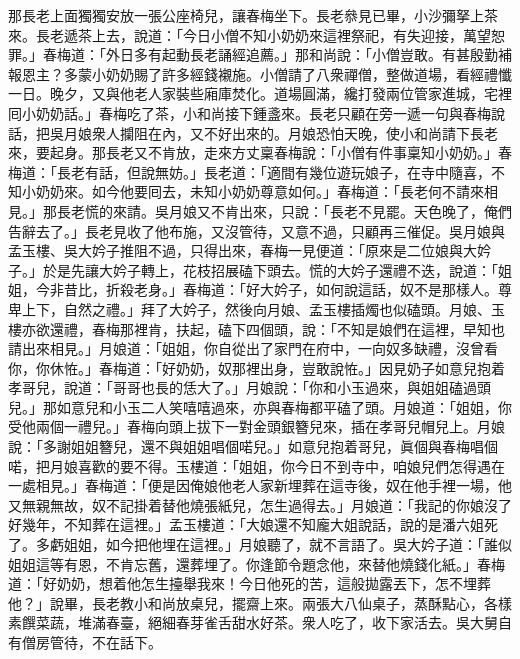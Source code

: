 那長老上面獨獨安放一張公座椅兒，讓春梅坐下。長老叅見已畢，小沙彌拏上茶來。長老遞茶上去，說道：「今日小僧不知小奶奶來這裡祭祀，有失迎接，萬望恕罪。」春梅道：「外日多有起動長老誦經追薦。」那和尚說：「小僧豈敢。有甚殷勤補報恩主？多蒙小奶奶賜了許多經錢襯施。小僧請了八衆禪僧，整做道場，看經禮懺一日。晚夕，又與他老人家裝些廂庫焚化。道場圓滿，纔打發兩位管家進城，宅裡囘小奶奶話。」春梅吃了茶，小和尚接下鍾盞來。長老只顧在旁一遞一句與春梅說話，把吳月娘衆人攔阻在內，又不好出來的。月娘恐怕天晚，使小和尚請下長老來，要起身。那長老又不肯放，走來方丈稟春梅說：「小僧有件事稟知小奶奶。」春梅道：「長老有話，但說無妨。」長老道：「適間有幾位遊玩娘子，在寺中隨喜，不知小奶奶來。如今他要囘去，未知小奶奶尊意如何。」春梅道：「長老何不請來相見。」那長老慌的來請。吳月娘又不肯出來，只說：「長老不見罷。天色晚了，俺們告辭去了。」{}長老見收了他布施，又沒管待，又意不過，只顧再三催促。吳月娘與孟玉樓、吳大妗子推阻不過，只得出來，春梅一見便道：「原來是二位娘與大妗子。」於是先讓大妗子轉上，花枝招展磕下頭去。慌的大妗子還禮不迭，說道：「姐姐，今非昔比，折殺老身。」春梅道：「好大妗子，如何說這話，奴不是那樣人。{}尊卑上下，自然之禮。」拜了大妗子，然後向月娘、孟玉樓插燭也似磕頭。月娘、玉樓亦欲還禮，春梅那裡肯，扶起，磕下四個頭，說：「不知是娘們在這裡，早知也請出來相見。」月娘道：「姐姐，你自從出了家門在府中，一向奴多缺禮，沒曾看你，你休恠。」{}春梅道：「好奶奶，奴那裡出身，豈敢說恠。」{}因見奶子如意兒抱着孝哥兒，說道：「哥哥也長的恁大了。」月娘說：「你和小玉過來，與姐姐磕過頭兒。」那如意兒和小玉二人笑嘻嘻過來，亦與春梅都平磕了頭。月娘道：「姐姐，你受他兩個一禮兒。」春梅向頭上拔下一對金頭銀簪兒來，插在孝哥兒帽兒上。月娘說：「多謝姐姐簪兒，還不與姐姐唱個喏兒。」如意兒抱着哥兒，眞個與春梅唱個喏，把月娘喜歡的要不得。玉樓道：「姐姐，你今日不到寺中，咱娘兒們怎得遇在一處相見。」春梅道：「便是因俺娘他老人家新埋葬在這寺後，奴在他手裡一場，他又無親無故，奴不記掛着替他燒張紙兒，怎生過得去。」月娘道：「我記的你娘沒了好幾年，不知葬在這裡。」{}孟玉樓道：「大娘還不知龐大姐說話，說的是潘六姐死了。多虧姐姐，如今把他埋在這裡。」月娘聽了，就不言語了。吳大妗子道：「誰似姐姐這等有恩，不肯忘舊，還葬埋了。{}你逢節令題念他，來替他燒錢化紙。」春梅道：「好奶奶，想着他怎生擡舉我來！今日他死的苦，這般拋露丟下，怎不埋葬他？」{}說畢，長老教小和尚放桌兒，擺齋上來。兩張大八仙桌子，蒸酥點心，各樣素饌菜蔬，堆滿春臺，絕細春芽雀舌甜水好茶。衆人吃了，收下家活去。吳大舅自有僧房管待，不在話下。

